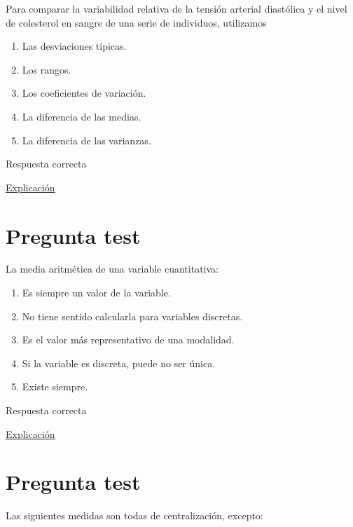 \documentclass[
]{book}
\providecommand{\tightlist}{%
  \setlength{\itemsep}{0pt}\setlength{\parskip}{0pt}}
\begin{document}
Para comparar la variabilidad relativa de la tensión arterial diastólica y el nivel de colesterol en sangre de una serie de individuos, utilizamos

\begin{enumerate}
\def\labelenumi{\alph{enumi})}
\tightlist
\item
  Las desviaciones típicas.
\item
  Los rangos.
\item
  Los coeficientes de variación.
\item
  La diferencia de las medias.
\item
  La diferencia de las varianzas.
\end{enumerate}

Respuesta correcta

\href{https://1fjmanzano.github.io/bioestadistica/medidas-de-posicio\%CC\%81n-dispersio\%CC\%81n-y-forma.html}{Explicación}

\hypertarget{pregunta-test-34}{%
\section{Pregunta test}\label{pregunta-test-34}}

La media aritmética de una variable cuantitativa:

\begin{enumerate}
\def\labelenumi{\alph{enumi})}
\tightlist
\item
  Es siempre un valor de la variable.
\item
  No tiene sentido calcularla para variables discretas.
\item
  Es el valor más representativo de una modalidad.
\item
  Si la variable es discreta, puede no ser única.
\item
  Existe siempre.
\end{enumerate}

Respuesta correcta

\href{https://1fjmanzano.github.io/bioestadistica/medidas-de-posicio\%CC\%81n-dispersio\%CC\%81n-y-forma.html\#medidas-de-posicio\%CC\%81n-centrales}{Explicación}

\hypertarget{pregunta-test-35}{%
\section{Pregunta test}\label{pregunta-test-35}}

Las siguientes medidas son todas de centralización, excepto:
\end{document}

